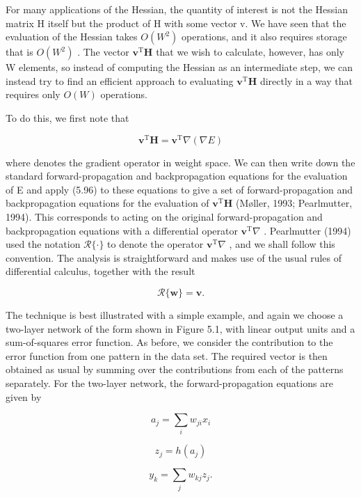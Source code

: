 \documentclass[
  10
]{article}
\begin{document}
For many applications of the Hessian, the quantity of interest is not
the Hessian matrix H itself but the product of H with some vector v. We
have seen that the evaluation of the Hessian takes \(O ( W ^ { 2 } )\)
operations, and it also requires storage that is \(O ( W ^ { 2 } )\) .
The vector \(\mathbf { v } ^ { \mathrm { T } } \mathbf { H }\) that we
wish to calculate, however, has only W elements, so instead of computing
the Hessian as an intermediate step, we can instead try to find an
efficient approach to evaluating
\(\mathbf { v } ^ { \mathrm { T } } \mathbf { H }\) directly in a way
that requires only \(O ( W )\) operations.

To do this, we first note that

\[
\mathbf {v} ^ {\mathrm{T}} \mathbf {H} = \mathbf {v} ^ {\mathrm{T}} \nabla (\nabla E)\tag{5.96}
\]

where denotes the gradient operator in weight space. We can then write
down the standard forward-propagation and backpropagation equations for
the evaluation of E and apply (5.96) to these equations to give a set of
forward-propagation and backpropagation equations for the evaluation of
\(\mathbf { v } ^ { \mathrm { T } } \mathbf { H }\) (Møller, 1993;
Pearlmutter, 1994). This corresponds to acting on the original
forward-propagation and backpropagation equations with a differential
operator \(\mathbf { v } ^ { \mathrm { T } } \nabla\) . Pearlmutter
(1994) used the notation \(\mathcal { R } \{ \cdot \}\) to denote the
operator \(\mathbf { v } ^ { \mathrm { T } } \nabla\) , and we shall
follow this convention. The analysis is straightforward and makes use of
the usual rules of differential calculus, together with the result

\[
\mathcal {R} \{\mathbf {w} \} = \mathbf {v}.\tag{5.97}
\]

The technique is best illustrated with a simple example, and again we
choose a two-layer network of the form shown in Figure 5.1, with linear
output units and a sum-of-squares error function. As before, we consider
the contribution to the error function from one pattern in the data set.
The required vector is then obtained as usual by summing over the
contributions from each of the patterns separately. For the two-layer
network, the forward-propagation equations are given by

\[
a _ {j} = \sum_ {i} w _ {j i} x _ {i}\tag{5.98}
\]

\[
z _ {j} = h (a _ {j})\tag{5.99}
\]

\[
y _ {k} = \sum_ {j} w _ {k j} z _ {j}.\tag{5.100}
\]
\end{document}
